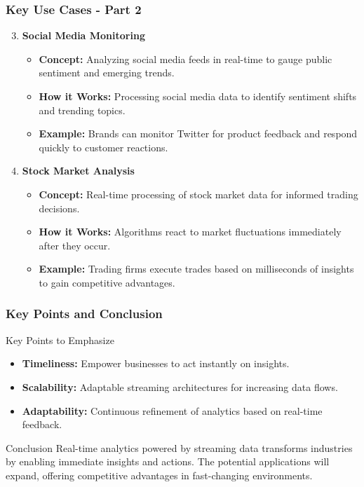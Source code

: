 \documentclass[aspectratio=169]{beamer}
\begin{document}
\begin{frame}[fragile]
    \frametitle{Key Use Cases - Part 2}
    \begin{enumerate}
        \setcounter{enumi}{2}
        \item \textbf{Social Media Monitoring}
            \begin{itemize}
                \item \textbf{Concept:} Analyzing social media feeds in real-time to gauge public sentiment and emerging trends.
                \item \textbf{How it Works:} Processing social media data to identify sentiment shifts and trending topics.
                \item \textbf{Example:} Brands can monitor Twitter for product feedback and respond quickly to customer reactions.
            \end{itemize}

        \item \textbf{Stock Market Analysis}
            \begin{itemize}
                \item \textbf{Concept:} Real-time processing of stock market data for informed trading decisions.
                \item \textbf{How it Works:} Algorithms react to market fluctuations immediately after they occur.
                \item \textbf{Example:} Trading firms execute trades based on milliseconds of insights to gain competitive advantages.
            \end{itemize}
    \end{enumerate}
\end{frame}

\begin{frame}[fragile]
    \frametitle{Key Points and Conclusion}
    \begin{block}{Key Points to Emphasize}
        \begin{itemize}
            \item \textbf{Timeliness:} Empower businesses to act instantly on insights.
            \item \textbf{Scalability:} Adaptable streaming architectures for increasing data flows.
            \item \textbf{Adaptability:} Continuous refinement of analytics based on real-time feedback.
        \end{itemize}
    \end{block}

    \begin{block}{Conclusion}
        Real-time analytics powered by streaming data transforms industries by enabling immediate insights and actions. The potential applications will expand, offering competitive advantages in fast-changing environments.
    \end{block}
\end{frame}
\end{document}
